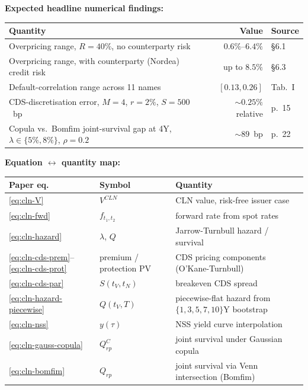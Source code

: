 \documentclass[11pt,a4paper]{article}
\begin{document}
\begin{validation}
\textbf{Expected headline numerical findings:}

\smallskip
\begin{tabular}{@{}p{8cm}rl@{}}
\toprule
Quantity                                                                  & Value                  & Source \\
\midrule
Overpricing range, $R = 40\%$, no counterparty risk                       & $0.6\%$--$6.4\%$       & \S6.1 \\
Overpricing range, with counterparty (Nordea) credit risk                 & up to $8.5\%$          & \S6.3 \\
Default-correlation range across 11 names                                 & $[0.13, 0.26]$         & Tab.~I \\
CDS-discretisation error, $M = 4$, $r = 2\%$, $S = 500$~bp                & $\sim 0.25\%$ relative & p.~15 \\
Copula vs.\ Bomfim joint-survival gap at 4Y, $\lambda \in \{5\%, 8\%\}$, $\rho = 0.2$ & $\sim 89$~bp & p.~22 \\
\bottomrule
\end{tabular}
\smallskip

\textbf{Equation $\leftrightarrow$ quantity map:}

\smallskip
\begin{tabular}{@{}p{2.8cm}p{3.8cm}p{6.2cm}@{}}
\toprule
Paper eq.                                       & Symbol                          & Quantity \\
\midrule
\eqref{eq:cln-V}                                & $V^{CLN}$                       & CLN value, risk-free issuer case \\
\eqref{eq:cln-fwd}                              & $f_{t_1, t_2}$                  & forward rate from spot rates \\
\eqref{eq:cln-hazard}                           & $\lambda$, $Q$                  & Jarrow-Turnbull hazard / survival \\
\eqref{eq:cln-cds-prem}--\eqref{eq:cln-cds-prot} & premium / protection PV        & CDS pricing components (O'Kane-Turnbull) \\
\eqref{eq:cln-cds-par}                          & $S(t_V, t_N)$                   & breakeven CDS spread \\
\eqref{eq:cln-hazard-piecewise}                 & $Q(t_V, T)$                     & piecewise-flat hazard from $\{1,3,5,7,10\}$Y bootstrap \\
\eqref{eq:cln-nss}                              & $y(\tau)$                       & NSS yield curve interpolation \\
\eqref{eq:cln-gauss-copula}                     & $Q^C_{rp}$                      & joint survival under Gaussian copula \\
\eqref{eq:cln-bomfim}                           & $Q_{rp}$                        & joint survival via Venn intersection (Bomfim) \\
\bottomrule
\end{tabular}
\smallskip


\end{validation}
\end{document}

